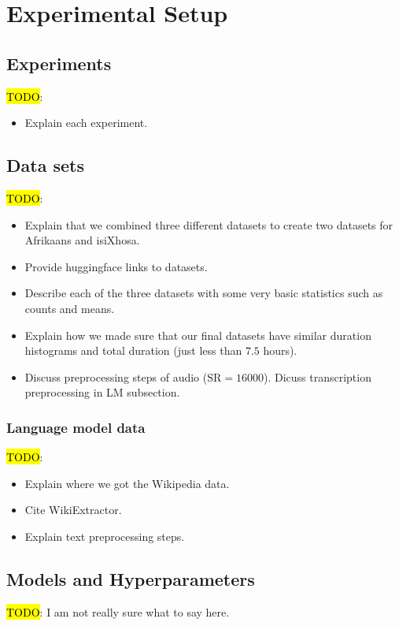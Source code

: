 \graphicspath{{experimental_setup/fig/}}

\chapter{Experimental Setup} \label{chap:experimental_setup}

\section{Experiments}
\hl{TODO}:
\begin{itemize}
    \item Explain each experiment.
\end{itemize}

\section{Data sets}
\hl{TODO}:
\begin{itemize}
    \item Explain that we combined three different datasets to create two datasets for Afrikaans and isiXhosa.
    \item Provide huggingface links to datasets.
    \item Describe each of the three datasets with some very basic statistics such as counts and means.
    \item Explain how we made sure that our final datasets have similar duration histograms and total duration (just less than $7.5$ hours).
    \item Discuss preprocessing steps of audio ($\text{SR} = 16000$). Dicuss transcription preprocessing in LM subsection.
\end{itemize}

\subsection{Language model data}
\hl{TODO}:
\begin{itemize}
    \item Explain where we got the Wikipedia data.
    \item Cite WikiExtractor.
    \item Explain text preprocessing steps.
\end{itemize}


\section{Models and Hyperparameters}
\hl{TODO}: I am not really sure what to say here.

